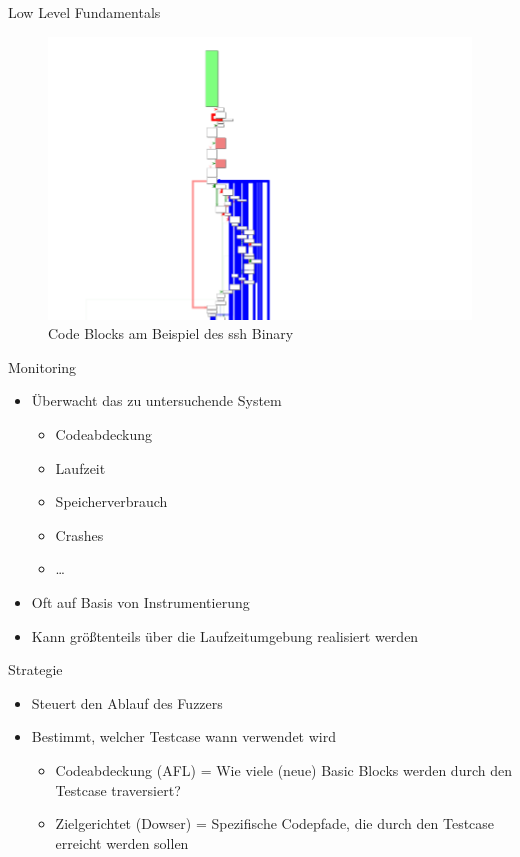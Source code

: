 \begin{frame}{Low Level Fundamentals}
    \begin{figure}[H]
        \centering
        \includegraphics[width=\textwidth]{res/call_graph_ssh}
        \caption[Code Blocks am Beispiel des ssh Binary]{Code Blocks am Beispiel des ssh Binary}
        \label{fig:code-coverage}
    \end{figure}
\end{frame}
\begin{frame}{Monitoring}
    \begin{itemize}
        \item Überwacht das zu untersuchende System
        \begin{itemize}
            \item Codeabdeckung
            \item Laufzeit
            \item Speicherverbrauch
            \item Crashes
            \item \ldots
        \end{itemize}
        \item Oft auf Basis von Instrumentierung
        \item Kann größtenteils über die Laufzeitumgebung realisiert werden
    \end{itemize}
\end{frame}
\begin{frame}{Strategie}
    \begin{itemize}
        \item Steuert den Ablauf des Fuzzers
        \item Bestimmt, welcher Testcase wann verwendet wird
        \begin{itemize}
            \item Codeabdeckung (AFL) = Wie viele (neue) Basic Blocks werden durch den Testcase traversiert?
            \item Zielgerichtet (Dowser) = Spezifische Codepfade, die durch den Testcase erreicht werden sollen
        \end{itemize}
    \end{itemize}
\end{frame}
